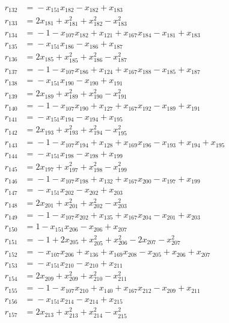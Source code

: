 \begin{align*}
r_{132} &={}-x_{151}x_{182} -x_{182} +x_{183} \\
r_{133} &={}2x_{181} +x_{181}^{2} +x_{182}^{2} -x_{183}^{2} \\
r_{134} &={}-1 -x_{107}x_{182} +x_{121} +x_{167}x_{184} -x_{181} +x_{183} \\
r_{135} &={}-x_{151}x_{186} -x_{186} +x_{187} \\
r_{136} &={}2x_{185} +x_{185}^{2} +x_{186}^{2} -x_{187}^{2} \\
r_{137} &={}-1 -x_{107}x_{186} +x_{124} +x_{167}x_{188} -x_{185} +x_{187} \\
r_{138} &={}-x_{151}x_{190} -x_{190} +x_{191} \\
r_{139} &={}2x_{189} +x_{189}^{2} +x_{190}^{2} -x_{191}^{2} \\
r_{140} &={}-1 -x_{107}x_{190} +x_{127} +x_{167}x_{192} -x_{189} +x_{191} \\
r_{141} &={}-x_{151}x_{194} -x_{194} +x_{195} \\
r_{142} &={}2x_{193} +x_{193}^{2} +x_{194}^{2} -x_{195}^{2} \\
r_{143} &={}-1 -x_{107}x_{194} +x_{128} +x_{169}x_{196} -x_{193} +x_{194} +x_{195} \\
r_{144} &={}-x_{151}x_{198} -x_{198} +x_{199} \\
r_{145} &={}2x_{197} +x_{197}^{2} +x_{198}^{2} -x_{199}^{2} \\
r_{146} &={}-1 -x_{107}x_{198} +x_{132} +x_{167}x_{200} -x_{197} +x_{199} \\
r_{147} &={}-x_{151}x_{202} -x_{202} +x_{203} \\
r_{148} &={}2x_{201} +x_{201}^{2} +x_{202}^{2} -x_{203}^{2} \\
r_{149} &={}-1 -x_{107}x_{202} +x_{135} +x_{167}x_{204} -x_{201} +x_{203} \\
r_{150} &={}1 -x_{151}x_{206} -x_{206} +x_{207} \\
r_{151} &={}-1 +2x_{205} +x_{205}^{2} +x_{206}^{2} -2x_{207} -x_{207}^{2} \\
r_{152} &={}-x_{107}x_{206} +x_{136} +x_{169}x_{208} -x_{205} +x_{206} +x_{207} \\
r_{153} &={}-x_{151}x_{210} -x_{210} +x_{211} \\
r_{154} &={}2x_{209} +x_{209}^{2} +x_{210}^{2} -x_{211}^{2} \\
r_{155} &={}-1 -x_{107}x_{210} +x_{140} +x_{167}x_{212} -x_{209} +x_{211} \\
r_{156} &={}-x_{151}x_{214} -x_{214} +x_{215} \\
r_{157} &={}2x_{213} +x_{213}^{2} +x_{214}^{2} -x_{215}^{2} \\

\end{align*}
